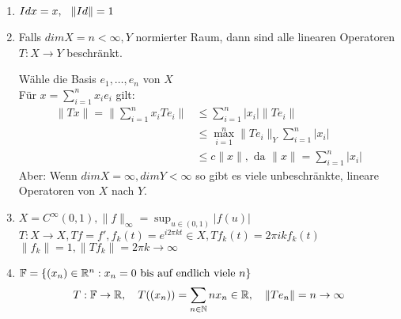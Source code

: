 \begin{beispiel}
	\begin{enumerate}[label=\alph*\upshape)]
		\item $Id x = x, \hspace{0.25cm} \|  Id \| = 1$
		\item Falls $dim X = n < \infty, Y$ normierter Raum, dann sind alle linearen Operatoren $T: X \rightarrow Y$ beschränkt.
		\begin{beweis}
			Wähle die Basis $e_{1}, \dotsc, e_{n}$ von $X$ \\
			Für $x = \sum_{i = 1}^{n} x_{i} e_{i}$ gilt:
			\begin{align*}
				\| Tx \| = \| \sum_{i = 1}^{n} x_{i} T e_{i} \| & \leq \sum_{i = 1}^{n} | x_{i} | \| T e_{i} \| \\
				& \leq \max_{i = 1}^{n} \| T e_{i} \|_{Y} \sum_{i = 1}^{n} |x_{i}| \\
				& \leq c \| x \|, \text{ da } \| x \| = \sum_{i = 1}^{n} |x_{i} |
			\end{align*}	
			Aber: Wenn $dim X = \infty, dim Y < \infty$ so gibt es viele unbeschränkte, lineare Operatoren von $X$ nach $Y$.
		\end{beweis}
		\item $X = C^{\infty}(0, 1), \| f \|_{\infty} = \sup_{u \in (0, 1)} |f(u)|$ \\
		$T:X \rightarrow X, Tf = f', f_{k}(t) = e^{i 2 \pi k t} \in X, Tf_{k}(t) = 2 \pi i k f_{k}(t)$ \\ 
		$ \| f_{k} \| = 1, \| Tf_{k} \| = 2 \pi k \rightarrow \infty $
		\item $\mathbb{F} = \{ (x_{n}) \in \mathbb{R}^{n}: x_{n} = 0 \text{ bis auf endlich viele } n \}$ \\
			\[ 
			  T: \mathbb{F} \rightarrow \mathbb{R}, \quad T( (x_{n}) ) = \sum_{n \in \mathbb{N}} n x_{n} \in \mathbb{R}, \quad
			 \| T e_{n} \| = n \rightarrow \infty
			\]
	\end{enumerate}	
\end{beispiel}



